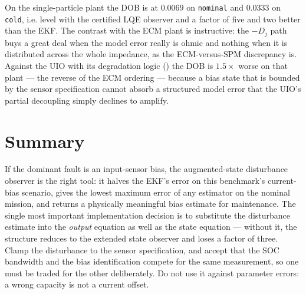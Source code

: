 On the single-particle plant the DOB is at $0.0069$ on \texttt{nominal} and $0.0333$ on
\texttt{cold}, i.e. level with the certified LQE observer and a factor of five and two better than
the EKF.  The contrast with the ECM plant is instructive: the $-D_j$ path buys a great deal when
the model error really is ohmic and nothing when it is distributed across the whole impedance, as
the ECM-versus-SPM discrepancy is.  Against the UIO with its degradation logic
() the DOB is $1.5\times$ worse on that plant --- the reverse of the ECM
ordering --- because a bias state that is bounded by the sensor specification cannot absorb a
structured model error that the UIO's partial decoupling simply declines to amplify.

\section{Summary}
If the dominant fault is an input-sensor bias, the augmented-state disturbance observer is the
right tool: it halves the EKF's error on this benchmark's current-bias scenario, gives the lowest
maximum error of any estimator on the nominal mission, and returns a physically meaningful bias
estimate for maintenance.  The single most important implementation decision is to substitute the
disturbance estimate into the \emph{output} equation as well as the state equation --- without it,
the structure reduces to the extended state observer and loses a factor of three.  Clamp the
disturbance to the sensor specification, and accept that the SOC bandwidth and the bias
identification compete for the same measurement, so one must be traded for the other
deliberately.  Do not use it against parameter errors: a wrong capacity is not a current offset.
